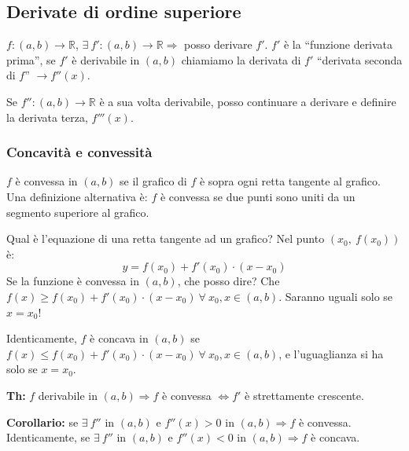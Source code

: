 \documentclass[12pt,a4paper]{article}
\begin{document}
\subsection{Derivate di ordine superiore}
$f:(a,b) \to \mathbb{R}$, $\exists \ f':(a,b) \to \mathbb{R} \Rightarrow$
posso derivare $f'$. $f'$ \`e la ``funzione derivata prima'', se $f'$ \`e
derivabile in $(a,b)$ chiamiamo la derivata di $f'$ ``derivata seconda
di $f$'' $\to f''(x)$.

Se $f'':(a,b) \to \mathbb{R}$ \`e a sua volta derivabile, posso continuare
a derivare e definire la derivata terza, $f'''(x)$.

\subsubsection{Concavit\`a e convessit\`a}
$f$ \`e convessa in $(a,b)$ se il grafico di $f$ \`e sopra ogni retta
tangente al grafico. Una definizione alternativa \`e: $f$ \`e convessa 
se due punti sono uniti da un segmento superiore al grafico.

\begin{center}
\end{center}

Qual \`e l'equazione di una retta tangente ad un grafico? Nel punto
$(x_0, \ f(x_0))$ \`e:
$$
y = f(x_0) + f'(x_0) \cdot (x - x_0)
$$
Se la funzione \`e convessa in $(a,b)$, che posso dire? Che 
$f(x) \geq f(x_0) + f'(x_0) \cdot (x - x_0) \ \forall \ x_0, x \in (a,b)$.
Saranno uguali solo se $x = x_0$!

Identicamente, $f$ \`e concava in $(a,b)$ se $f(x) \leq f(x_0) + f'(x_0) 
\cdot (x - x_0) \ \forall \ x_0, x \in (a,b)$, e l'uguaglianza si ha 
solo se $x = x_0$.

\textbf{Th:} $f$ derivabile in $(a,b) \Rightarrow f$ \`e convessa 
$ \Leftrightarrow f'$ \`e strettamente crescente.

\textbf{Corollario:} se $\exists \ f''$ in $(a,b)$ e $f''(x) > 0$ in $(a,b)
\Rightarrow f$ \`e convessa. Identicamente, se $\exists \ f''$ in $(a,b)$ 
e $f''(x) < 0$ in $(a,b) \Rightarrow f$ \`e concava.
\end{document}
